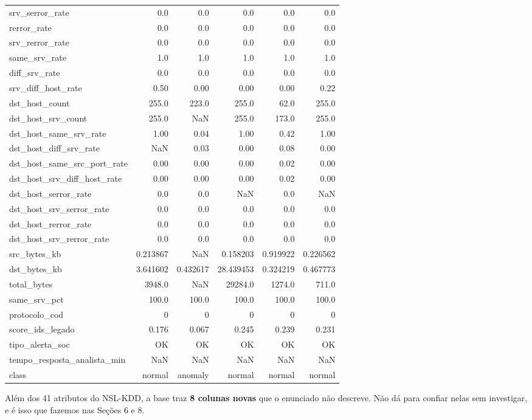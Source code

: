 \documentclass[11pt,a4paper]{article}
\begin{document}
{\begin{longtable}{lrrrrr}
srv\_serror\_rate & 0.0 & 0.0 & 0.0 & 0.0 & 0.0 \\
rerror\_rate & 0.0 & 0.0 & 0.0 & 0.0 & 0.0 \\
srv\_rerror\_rate & 0.0 & 0.0 & 0.0 & 0.0 & 0.0 \\
same\_srv\_rate & 1.0 & 1.0 & 1.0 & 1.0 & 1.0 \\
diff\_srv\_rate & 0.0 & 0.0 & 0.0 & 0.0 & 0.0 \\
srv\_diff\_host\_rate & 0.50 & 0.00 & 0.00 & 0.00 & 0.22 \\
dst\_host\_count & 255.0 & 223.0 & 255.0 & 62.0 & 255.0 \\
dst\_host\_srv\_count & 255.0 & NaN & 255.0 & 173.0 & 255.0 \\
dst\_host\_same\_srv\_rate & 1.00 & 0.04 & 1.00 & 0.42 & 1.00 \\
dst\_host\_diff\_srv\_rate & NaN & 0.03 & 0.00 & 0.08 & 0.00 \\
dst\_host\_same\_src\_port\_rate & 0.00 & 0.00 & 0.00 & 0.02 & 0.00 \\
dst\_host\_srv\_diff\_host\_rate & 0.00 & 0.00 & 0.00 & 0.02 & 0.00 \\
dst\_host\_serror\_rate & 0.0 & 0.0 & NaN & 0.0 & NaN \\
dst\_host\_srv\_serror\_rate & 0.0 & 0.0 & 0.0 & 0.0 & 0.0 \\
dst\_host\_rerror\_rate & 0.0 & 0.0 & 0.0 & 0.0 & 0.0 \\
dst\_host\_srv\_rerror\_rate & 0.0 & 0.0 & 0.0 & 0.0 & 0.0 \\
src\_bytes\_kb & 0.213867 & NaN & 0.158203 & 0.919922 & 0.226562 \\
dst\_bytes\_kb & 3.641602 & 0.432617 & 28.439453 & 0.324219 & 0.467773 \\
total\_bytes & 3948.0 & NaN & 29284.0 & 1274.0 & 711.0 \\
same\_srv\_pct & 100.0 & 100.0 & 100.0 & 100.0 & 100.0 \\
protocolo\_cod & 0 & 0 & 0 & 0 & 0 \\
score\_ids\_legado & 0.176 & 0.067 & 0.245 & 0.239 & 0.231 \\
tipo\_alerta\_soc & OK & OK & OK & OK & OK \\
tempo\_resposta\_analista\_min & NaN & NaN & NaN & NaN & NaN \\
class & normal & anomaly & normal & normal & normal \\
\end{longtable}
}

Além dos 41 atributos do NSL-KDD, a base traz \textbf{8 colunas novas} que o enunciado não descreve. Não dá para confiar nelas sem investigar, e é isso que fazemos nas Seções 6 e 8.
\end{document}
